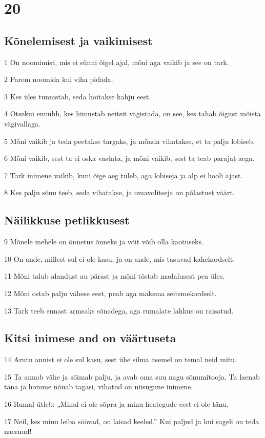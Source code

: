 \chapter{20}

\section*{Kõnelemisest ja vaikimisest}

\par 1 On noomimist, mis ei sünni õigel ajal, mõni aga vaikib ja see on tark.
\par 2 Parem noomida kui viha pidada.
\par 3 Kes üles tunnistab, seda hoitakse kahju eest.
\par 4 Otsekui eunuhh, kes himustab neitsit vägistada, on see, kes tahab õigust mõista vägivallaga.
\par 5 Mõni vaikib ja teda peetakse targaks, ja mõnda vihatakse, et ta palju lobiseb.
\par 6 Mõni vaikib, sest ta ei oska vastata, ja mõni vaikib, sest ta teab parajat aega.
\par 7 Tark inimene vaikib, kuni õige aeg tuleb, aga lobiseja ja alp ei hooli ajast.
\par 8 Kes palju sõnu teeb, seda vihatakse, ja omavolitseja on põlastust väärt.

\section*{Näilikkuse petlikkusest}

\par 9 Mõnele mehele on õnnetus õnneks ja võit võib olla kaotuseks.
\par 10 On ande, millest sul ei ole kasu, ja on ande, mis tasuvad kahekordselt.
\par 11 Mõni talub alandust au pärast ja mõni tõstab madalusest pea üles.
\par 12 Mõni ostab palju vähese eest, peab aga maksma seitsmekordselt.
\par 13 Tark teeb ennast armsaks sõnadega, aga rumalate lahkus on raisatud.

\section*{Kitsi inimese and on väärtuseta}

\par 14 Arutu annist ei ole sul kasu, sest ühe silma asemel on temal neid mitu.
\par 15 Ta annab vähe ja sõimab palju, ja avab oma suu nagu sõnumitooja. Ta laenab täna ja homme nõuab tagasi, vihatud on niisugune inimene.
\par 16 Rumal ütleb: „Minul ei ole sõpra ja minu heategude eest ei ole tänu.
\par 17 Neil, kes minu leiba söövad, on laisad keeled.” Kui paljud ja kui sageli on teda naernud!

